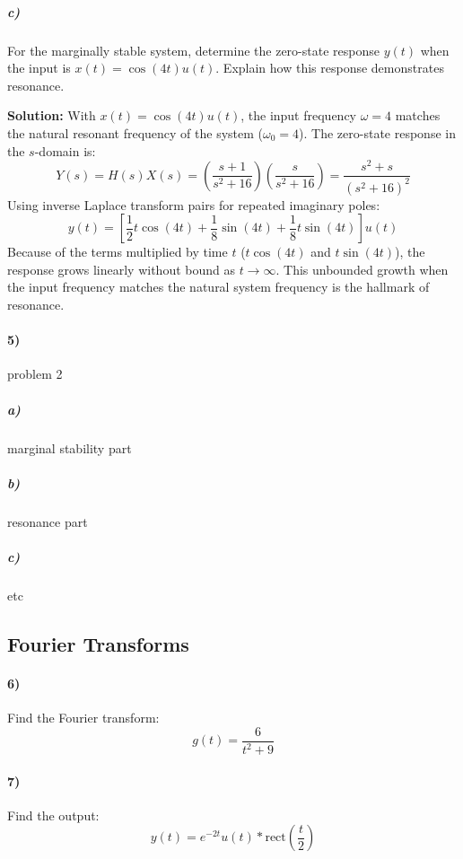 \documentclass{article}
\begin{document}
\subparagraph{c)} For the marginally stable system, determine the zero-state response $y(t)$ when the input is $x(t) = \cos(4t)u(t)$. Explain how this response demonstrates resonance.

\textbf{Solution:} With $x(t) = \cos(4t)u(t)$, the input frequency $\omega = 4$ matches the natural resonant frequency of the system ($\omega_0 = 4$). The zero-state response in the $s$-domain is:
$$Y(s) = H(s)X(s) = \left(\frac{s + 1}{s^2 + 16}\right)\left(\frac{s}{s^2 + 16}\right) = \frac{s^2 + s}{(s^2 + 16)^2}$$
Using inverse Laplace transform pairs for repeated imaginary poles:
$$y(t) = \left[ \frac{1}{2}t\cos(4t) + \frac{1}{8}\sin(4t) + \frac{1}{8}t\sin(4t) \right] u(t)$$
Because of the terms multiplied by time $t$ ($t\cos(4t)$ and $t\sin(4t)$), the response grows linearly without bound as $t \to \infty$. This unbounded growth when the input frequency matches the natural system frequency is the hallmark of resonance.

\vfill

\newpage

\paragraph{5)} problem 2

\subparagraph{a)} marginal stability part

\subparagraph{b)} resonance part

\subparagraph{c)} etc

\vfill

\newpage

\subsection*{Fourier Transforms}

\paragraph{6)} Find the Fourier transform: $$g(t)=\frac{6}{t^2+9}$$

\vfill

\paragraph{7)} Find the output: $$y(t)=e^{-2t}u(t)\ast \mathrm{rect}(\frac{t}{2})$$

\vfill
\end{document}
